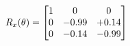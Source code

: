 \documentclass[preview]{standalone}
\begin{document}
\begin{align*}
\special{dvisvgm:raw <g id='unique000'>}R_{x}(\theta) = \begin{bmatrix}1 & 0 & 0 \\0 & -0.99 & +0.14 \\0 & -0.14 & -0.99\end{bmatrix}\special{dvisvgm:raw </g>}
\end{align*}
\end{document}
